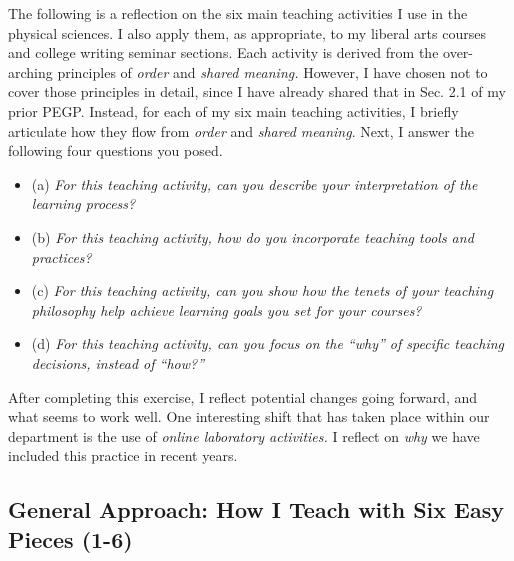 \documentclass[../../../main.tex]{subfiles}
\begin{document}
The following is a reflection on the six main teaching activities I use in the physical sciences.  I also apply them, as appropriate, to my liberal arts courses and college writing seminar sections.  Each activity is derived from the over-arching principles of \textit{order} and \textit{shared meaning.}  However, I have chosen not to cover those principles in detail, since I have already shared that in Sec. 2.1 of my prior PEGP.  Instead, for each of my six main teaching activities, I briefly articulate how they flow from \textit{order} and \textit{shared meaning}.  Next, I answer the following four questions you posed.
\begin{itemize}
\item (a) \textit{For this teaching activity, can you describe your interpretation of the learning process?}
\item (b) \textit{For this teaching activity, how do you incorporate teaching tools and practices?}
\item (c) \textit{For this teaching activity, can you show how the tenets of your teaching philosophy help achieve learning goals you set for your courses?}
\item (d) \textit{For this teaching activity, can you focus on the ``why'' of specific teaching decisions, instead of ``how?''}
\end{itemize} 
After completing this exercise, I reflect potential changes going forward, and what seems to work well.  One interesting shift that has taken place within our department is the use of \textit{online laboratory activities.}  I reflect on \textit{why} we have included this practice in recent years.

\subsection{General Approach: How I Teach with Six Easy Pieces (1-6)}
\end{document}
